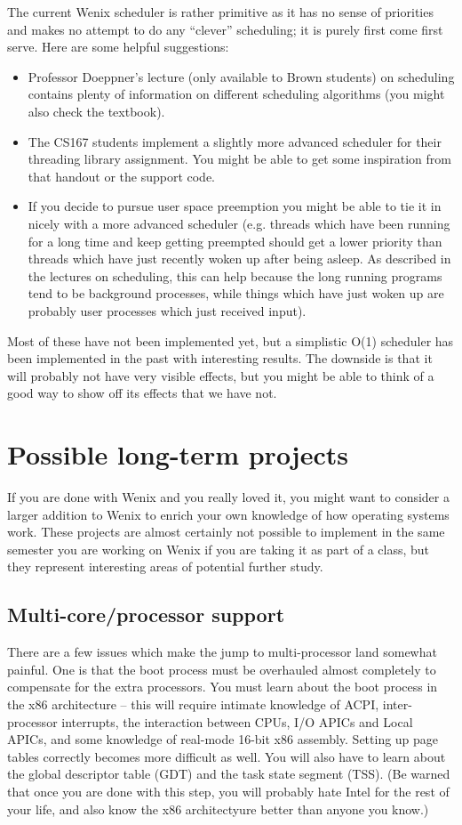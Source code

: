 The current Wenix scheduler is rather primitive as it has no sense of priorities and makes no attempt to do any ``clever'' scheduling; it is purely first come first serve. Here are some helpful suggestions:
\begin{itemize}
    \item Professor Doeppner's lecture (only available to Brown students) on scheduling contains plenty of information on different scheduling algorithms (you might also check the textbook).
    \item The CS167 students implement a slightly more advanced scheduler for their threading library assignment. You might be able to get some inspiration from that handout or the support code.
    \item If you decide to pursue user space preemption you might be able to tie it in nicely with a more advanced scheduler (e.g. threads which have been running for a long time and keep getting preempted should get a lower priority than threads which have just recently woken up after being asleep. As described in the lectures on scheduling, this can help because the long running programs tend to be background processes, while things which have just woken up are probably user processes which just received input). %
\end{itemize}

Most of these have not been implemented yet, but a simplistic O(1) scheduler has been implemented in the past with interesting results. The downside is that it will probably not have very visible effects, but you might be able to think of a good way to show off its effects that we have not.

\section{Possible long-term projects}
If you are done with Wenix and you really loved it, you might want to consider a larger addition to Wenix to enrich your own knowledge of how operating systems work. These projects are almost certainly not possible to implement in the same semester you are working on Wenix if you are taking it as part of a class, but they represent interesting areas of potential further study.

\subsection{Multi-core/processor support}
There are a few issues which make the jump to multi-processor land somewhat painful. One is that the boot process must be overhauled almost completely to compensate for the extra processors. You must learn about the boot process in the x86 architecture -- this will require intimate knowledge of ACPI, inter-processor interrupts, the interaction between CPUs, I/O APICs and Local APICs, and some knowledge of real-mode 16-bit x86 assembly. Setting up page tables correctly becomes more difficult as well. You will also have to learn about the global descriptor table (GDT) and the task state segment (TSS). (Be warned that once you are done with this step, you will probably hate Intel for the rest of your life, and also know the x86 architectyure better than anyone you know.)

